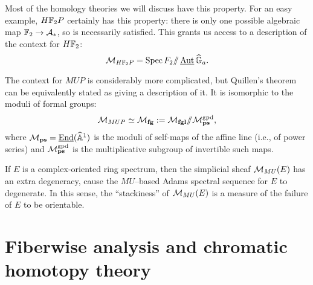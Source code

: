 \begin{example}
Most of the homology theories we will discuss have this property.  For an easy example, $H\mathbb F_2P$ certainly has this property: there is only one possible algebraic map $\mathbb F_2 \to \mathcal A_*$, so {\FH} is necessarily satisfied.  This grants us access to a description of the context for $H\mathbb F_2$: \[\mathcal{M}_{H\mathbb F_2P} = \operatorname{Spec} F_2 /\!\!/ \operatorname{\underline{\smash{\operatorname{Aut}}}}{\widehat{\mathbb G}_a}.\]
\end{example}

\begin{example}\label{ContextOfMUPExample}
The context for $MUP$ is considerably more complicated, but Quillen's theorem can be equivalently stated as giving a description of it.  It is isomorphic to the moduli of formal groups: \[\mathcal{M}_{MUP} \simeq \mathcal{M}_{\mathbf{fg}} := \mathcal{M}_{\mathbf{fgl}} /\!\!/ \mathcal{M}_{\mathbf{ps}}^{\mathrm{gpd}},\] where $\mathcal{M}_{\mathbf{ps}} = \operatorname{\underline{\smash{\operatorname{End}}}}(\widehat{\mathbb{A}}^1)$ is the moduli of self-maps of the affine line (i.e., of power series) and $\mathcal{M}_{\mathbf{ps}}^{\mathrm{gpd}}$ is the multiplicative subgroup of invertible such maps.
\end{example}

\begin{remark}
If $E$ is a complex-oriented ring spectrum, then the simplicial sheaf $\mathcal{M}_{MU}(E)$ has an extra degeneracy, cause the $MU$--based Adams spectral sequence for $E$ to degenerate.  In this sense, the ``stackiness'' of $\mathcal{M}_{MU}(E)$ is a measure of the failure of $E$ to be orientable.
\end{remark}







\section{Fiberwise analysis and chromatic homotopy theory}\label{StructureOfMfgl}


